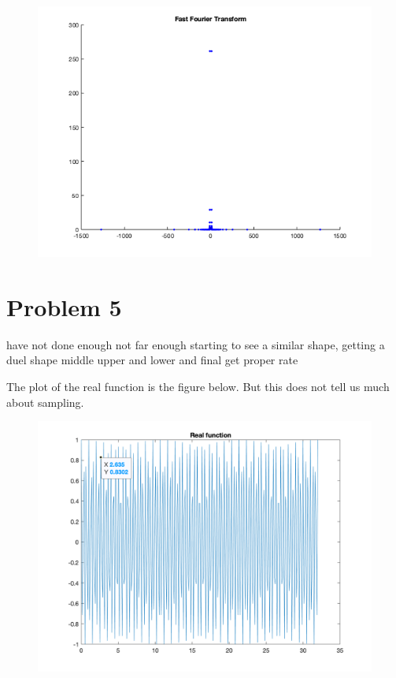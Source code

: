 \documentclass[12pt]{article}
\begin{document}
\begin{figure}[h!]
    \centering
    {{\includegraphics[width=15cm]{FFT.png}}}%
    \qquad
    \caption{ }%
    \label{fig:example}%
\end{figure}

\newpage

\section*{Problem 5}

have not done enough
not far enough starting to see a similar shape, getting a duel shape
middle upper and lower
and final get proper rate

The plot of the real function is the figure below. But this does not tell us much about sampling. 

\begin{figure}[h!]
    \centering
    {{\includegraphics[width=15cm]{problem_5.png}}}%
    \qquad
    \caption{ }%
    \label{fig:example}%
\end{figure}
\end{document}
